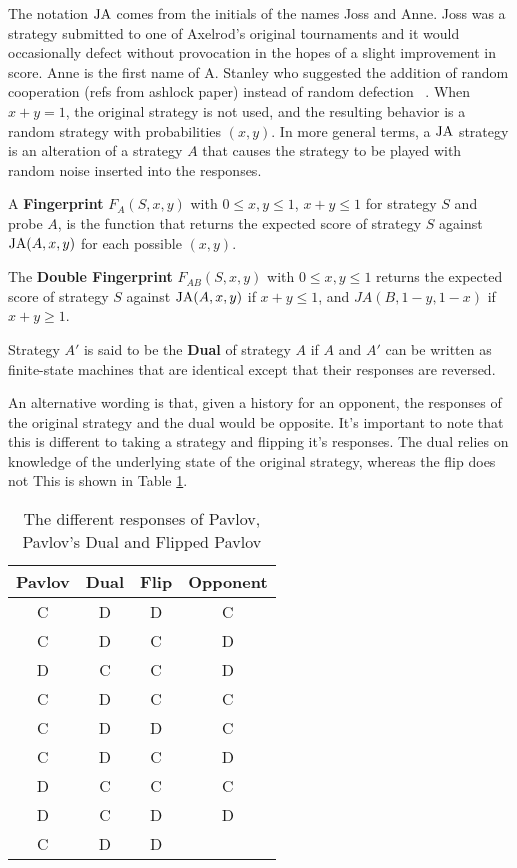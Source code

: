 The notation $\text{JA}$ comes from the initials of the names Joss and Anne.
Joss was a strategy submitted to one of Axelrod’s original tournaments and it would occasionally defect without provocation in the hopes of a slight improvement in score.
Anne is the first name of A. Stanley who suggested the addition of random cooperation (refs from ashlock paper) instead of random defection ~\cite{Ashlock2008}.
When $x + y = 1$, the original strategy is not used, and the resulting behavior is a random strategy with probabilities $(x, y)$.
In more general terms, a $\text{JA}$ strategy is an alteration of a strategy $A$ that causes the strategy to be played with random noise inserted into the responses.

\begin{definition}\label{def:fingerprint}
A \textbf{Fingerprint} $F_A(S, x, y)$ with $0 \leq x, y \leq 1$, $x+y \leq 1$ for strategy $S$ and probe $A$, is the function that returns the expected score of strategy $S$ against $\text{JA}(A, x, y)$ for each possible $(x, y)$.
\end{definition}



\begin{definition}\label{def:double-fingerprint}
The \textbf{Double Fingerprint} $F_{AB}(S, x, y)$ with $0 \leq x, y \leq 1$ returns the expected score of strategy $S$ against $\text{JA}(A, x, y)$ if $x+y \leq 1$, and $JA(B, 1-y, 1-x)$ if $x+y \geq 1$.
\end{definition}

\begin{definition}\label{def:dual}
Strategy $A'$ is said to be the \textbf{Dual} of strategy $A$ if $A$ and $A'$ can be written as finite-state machines that are identical except that their responses are reversed.
\end{definition}

An alternative wording is that, given a history for an opponent, the responses of the original strategy and the dual would be opposite.
It's important to note that this is different to taking a strategy and flipping it's responses.
The dual relies on knowledge of the underlying state of the original strategy, whereas the flip does not
This is shown in Table \ref{tab:strat-dual-flip}.

\begin{table}[htbp]
\centering
\begin{tabular}{c c  c | c}
Pavlov & Dual & Flip & Opponent \\
\hline
C & D & D & C\\
C & D & C & D\\
D & C & C & D\\
C & D & C & C\\
C & D & D & C\\
C & D & C & D\\
D & C & C & C\\
D & C & D & D\\
C & D & D &
\end{tabular}
\caption{The different responses of Pavlov, Pavlov's Dual and Flipped Pavlov}
\label{tab:strat-dual-flip}
\end{table}

